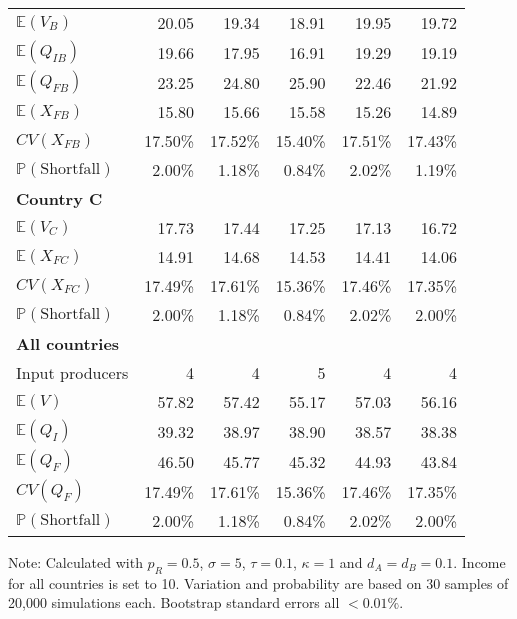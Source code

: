 \documentclass{article}
\begin{document}
\begin{table}
\begin{threeparttable}
\begin{tabular}{lrrrrr}
            $\mathbb{E}(V_B)$ & 20.05 & 19.34 & 18.91 & 19.95 & 19.72 \\
            $\mathbb{E}(Q_{IB})$ & 19.66 & 17.95 & 16.91 & 19.29 & 19.19 \\
            $\mathbb{E}(Q_{FB})$ & 23.25 & 24.80 & 25.90 & 22.46 & 21.92 \\
            $\mathbb{E}(X_{FB})$ & 15.80 & 15.66 & 15.58 & 15.26 & 14.89 \\
            $CV(X_{FB})$ & 17.50\% & 17.52\% & 15.40\% & 17.51\% & 17.43\% \\
            $\mathbb{P}(\text{Shortfall})$ & 2.00\% & 1.18\% & 0.84\% & 2.02\% & 1.19\% \\ 
            \midrule
            \textbf{Country C} \\
            $\mathbb{E}(V_C)$ & 17.73 & 17.44 & 17.25 & 17.13 & 16.72 \\
            $\mathbb{E}(X_{FC})$ & 14.91 & 14.68 & 14.53 & 14.41 & 14.06 \\
            $CV(X_{FC})$ & 17.49\% & 17.61\% & 15.36\% & 17.46\% & 17.35\% \\
            $\mathbb{P}(\text{Shortfall})$ & 2.00\% & 1.18\% & 0.84\% & 2.02\% & 2.00\% \\ 
            \midrule
            \textbf{All countries} \\
            Input producers & 4 & 4 & 5 & 4 & 4 \\
            $\mathbb{E}(V)$ & 57.82 & 57.42 & 55.17 & 57.03 & 56.16 \\
            $\mathbb{E}(Q_I)$ & 39.32 & 38.97 & 38.90 & 38.57 & 38.38 \\
            $\mathbb{E}(Q_F)$ & 46.50 & 45.77 & 45.32 & 44.93 & 43.84 \\
            $CV(Q_F)$ & 17.49\% & 17.61\% & 15.36\% & 17.46\% & 17.35\% \\
            $\mathbb{P}(\text{Shortfall})$ & 2.00\% &1.18\% & 0.84\% & 2.02\% & 2.00\% \\ 
            \bottomrule
        \end{tabular}
        \begin{tablenotes}
            \small \item Note: Calculated with $p_R = 0.5$, $\sigma = 5$, $\tau = 0.1$, $\kappa = 1$ and $d_A = d_B = 0.1$. Income for all countries is set to 10. Variation and probability are based on 30 samples of 20,000 simulations each. Bootstrap standard errors all $<0.01\%$.
        \end{tablenotes}
    \end{threeparttable}
\end{table}
\end{document}
